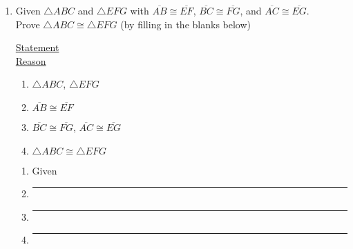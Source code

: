 \begin{enumerate}
 \item Given $\triangle ABC$ and $\triangle EFG$ with $\overline{AB} \cong \overline{EF}$, $\overline{BC} \cong \overline{FG}$, and $\overline{AC} \cong \overline{EG}$. \\Prove $\triangle ABC \cong \triangle EFG$ (by filling in the blanks below)\\[0.5cm]
   \begin{multicols}{2}
     \underline{Statement} \\
     \underline{Reason}
   \end{multicols}
   \begin{multicols}{2}
     \raggedcolumns
     \begin{enumerate}[label={\arabic*)}]
       \item $\triangle ABC$, $\triangle EFG$
       \item $\overline{AB} \cong \overline{EF}$
       \item $\overline{BC} \cong \overline{FG}$, $\overline{AC} \cong \overline{EG}$
       \item $\triangle ABC \cong \triangle EFG$ \\
     \end{enumerate}
     \begin{enumerate}[label={\arabic*)}]
       \item Given
       \item \rule{4cm}{0.15mm}
       \item \rule{4cm}{0.15mm}
       \item \rule{4cm}{0.15mm}
     \end{enumerate}
   \end{multicols}


\end{enumerate}
